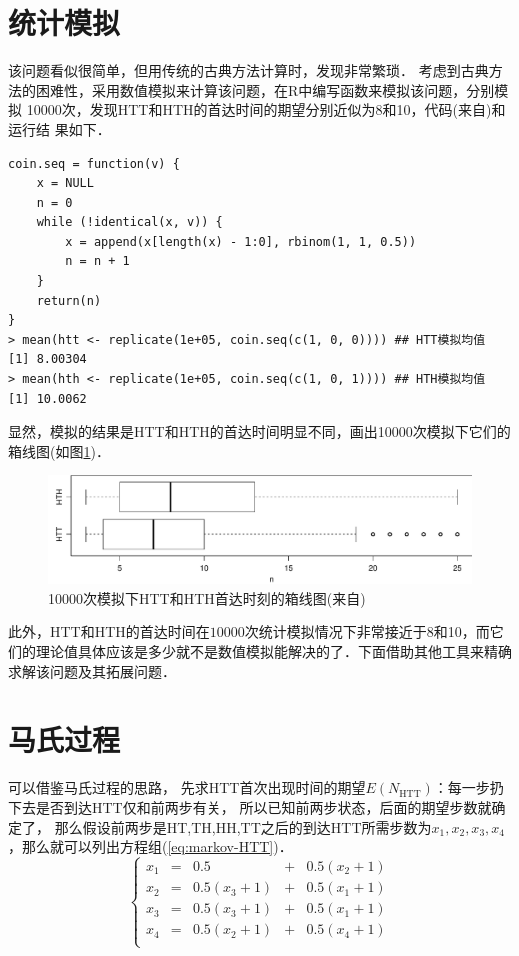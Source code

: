 \documentclass{article}
\begin{document}
\section{统计模拟}
该问题看似很简单，但用传统的古典方法计算时，发现非常繁琐．
考虑到古典方法的困难性，采用数值模拟来计算该问题，在R中编写函数来模拟该问题，分别模拟
10000次，发现HTT和HTH的首达时间的期望分别近似为8和10，代码(来自\cite{3})和运行结
果如下．
\begin{small}
\begin{verbatim}
coin.seq = function(v) {
    x = NULL
    n = 0
    while (!identical(x, v)) {
        x = append(x[length(x) - 1:0], rbinom(1, 1, 0.5))
        n = n + 1
    }
    return(n)
}
> mean(htt <- replicate(1e+05, coin.seq(c(1, 0, 0)))) ## HTT模拟均值
[1] 8.00304
> mean(hth <- replicate(1e+05, coin.seq(c(1, 0, 1)))) ## HTH模拟均值
[1] 10.0062
\end{verbatim}
\end{small}

显然，模拟的结果是HTT和HTH的首达时间明显不同，画出10000次模拟下它们的箱线图(如图\ref{fig:coin})．
\begin{figure}[btp]
\centering
\includegraphics[width=14cm]{coin.pdf}
\caption{10000次模拟下HTT和HTH首达时刻的箱线图(来自\cite{3})}\label{fig:coin}
\end{figure}

此外，HTT和HTH的首达时间在$10000$次统计模拟情况下非常接近于8和10，而它们的理论值具体应该是多少就不是数值模拟能解决的了．下面借助其他工具来精确求解该问题及其拓展问题．



\section{马氏过程}
可以借鉴马氏过程的思路， 先求HTT首次出现时间的期望$E(N_\text{HTT})$：每一步扔下去是否到达HTT仅和前两步有关，
所以已知前两步状态，后面的期望步数就确定了，
那么假设前两步是HT,TH,HH,TT之后的到达HTT所需步数为$x_1,x_2,x_3,x_4$，那么就可以列出方程组(\ref{eq:markov-HTT})．
\begin{equation}\label{eq:markov-HTT}
\left\{
\begin{array}{rrrrrr}
x_1&=&0.5&+&0.5(x_2+1)\\
x_2&=&0.5(x_3+1)&+&0.5(x_1+1)\\
x_3&=&0.5(x_3+1)&+&0.5(x_1+1)\\
x_4&=&0.5(x_2+1)&+&0.5(x_4+1)\\
\end{array}\right.
\end{equation}
\end{document}
